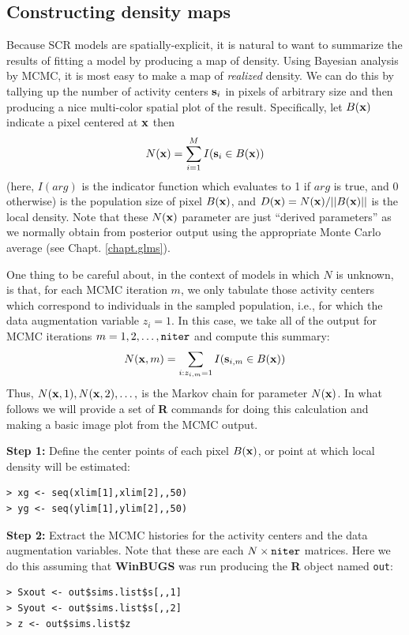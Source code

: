 \subsection{Constructing density maps}
\label{scr0.sec.mapping}

Because SCR models are spatially-explicit, it is natural to want to
summarize the results of fitting a model by producing a map of
density.  Using Bayesian analysis by MCMC, it is most easy to make a
map of {\it realized} density.  We can do this by tallying up the
number of activity centers ${\bf s}_{i}$ in pixels of arbitrary size
and then producing a nice multi-color spatial plot of the result.
Specifically, let $B({\bf x})$ indicate a pixel centered at ${\bf x}$
then
\[
N({\bf x})=\sum_{i=1}^{M} I({\bf s}_{i} \in B({\bf x}))
\]
(here, $I(arg)$ is the indicator function which evaluates to 1 if
$arg$ is true, and 0 otherwise)
is the population size of pixel  $B({\bf x})$, and $D({\bf x}) = N({\bf
  x})/||B({\bf x})||$ is the local density.
Note that these $N({\bf x})$ parameter are just ``derived
parameters'' as we normally obtain from posterior output using the
appropriate Monte Carlo average (see Chapt.  \ref{chapt.glms}).

One thing to be careful about, in the context of models in which $N$
is unknown, is that, for each MCMC iteration $m$, we only tabulate
those activity centers which correspond to individuals in the sampled
population, i.e., for which the data augmentation variable $z_{i} =
1$.  In this case, we take all of the output for MCMC iterations
$m=1,2,\ldots,\mbox{\tt niter}$ and compute this summary:
\[
   N({\bf x},m) = \sum_{i: z_{i,m}=1} I({\bf s}_{i,m} \in B({\bf x}))
\]
Thus, $N({\bf x},1),N({\bf x},2),\dots,$ is the Markov chain for
parameter $N({\bf x})$.  In what follows we will provide a set of {\bf
  R} commands for doing this calculation and making a basic image
plot from the MCMC output.

{\flushleft \bf Step 1:} Define the center points of each pixel $B({\bf
  x})$, or point at which local density will be estimated:
\begin{verbatim}
> xg <- seq(xlim[1],xlim[2],,50)
> yg <- seq(ylim[1],ylim[2],,50)
\end{verbatim}

{\flushleft \bf Step 2:} Extract the MCMC histories for the activity
centers and the data augmentation variables.  Note that these are each
$N \times \mbox{\tt niter}$ matrices. Here we do this assuming that
{\bf WinBUGS} was run producing the {\bf R} object named \mbox{\tt out}:
\begin{verbatim}
> Sxout <- out$sims.list$s[,,1]
> Syout <- out$sims.list$s[,,2]
> z <- out$sims.list$z
\end{verbatim}

